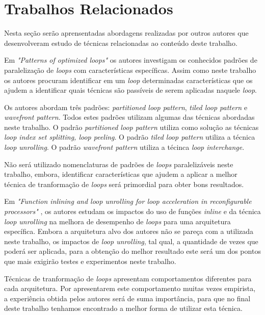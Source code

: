 
\chapter{Trabalhos Relacionados}

Nesta seção serão aprensentadas abordagens realizadas por outros autores que 
desenvolveram estudo de técnicas relacionadas ao conteúdo deste trabalho.

Em \textit{"Patterns of optimized loops"} \cite{Tasharofi:2010} os autores
investigam os conhecidos padrões de paralelização de \textit{loops} com
características específicas.  
Assim como neste trabalho os autores procuram identificar em um 
\textit{loop} determinadas características que os ajudem a identificar quais
técnicas são passíveis de serem aplicadas naquele \textit{loop}.

Os autores abordam três padrões: \textit{partitioned loop pattern}, \textit{tiled
loop pattern} e \textit{wavefront pattern}. 
Todos estes padrões utilizam algumas das técnicas abordadas neste trabalho. 
O padrão \textit{partitioned loop pattern} utiliza como solução as técnicas
\textit{loop index set splitting, loop peeling}. 
O padrão \textit{tiled loop pattern} utiliza a técnica \textit{loop unrolling}. 
O padrão \textit{wavefront pattern} utiliza a técinca \textit{loop interchange}.

Não será utilizado nomenclaturas de padrões de \textit{loops} paralelizáveis
neste trabalho, embora, identificar características que ajudem a aplicar a
melhor técnica de tranformação de \textit{loops} será primordial para obter bons
resultados.


Em \textit{"Function inlining and loop unrolling for loop acceleration in
reconfigurable processors"} \cite{Miniskar:2012}, os autores estudam os impactos
do uso de funções \textit{inline} e da técnica \textit{loop unrolling} na
melhora de desempenho de \textit{loops} para uma arquitetura específica.
Embora a arquitetura alvo dos autores não se pareça com a utilizada neste
trabalho, os impactos de \textit{loop unrolling}, tal qual, a quantidade de
vezes que poderá ser aplicada, para a obtenção do melhor resultado este será
um dos pontos que mais exigirão testes e experimentos neste trabalho.

Técnicas de tranformação de \textit{loops} apresentam comportamentos diferentes 
para cada arquitetura. 
Por apresentarem este comportamento muitas vezes empirista, a experiência obtida
pelos autores será de suma importância, para que no final deste trabalho tenhamos
encontrado a melhor forma de utilizar esta técnica.

